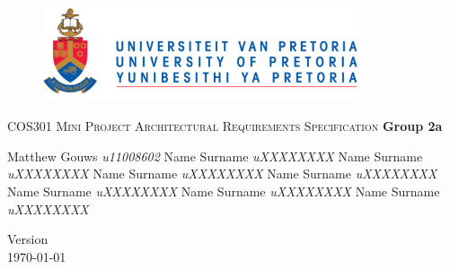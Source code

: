 \begin{titlepage}
\begin{center}
	\begin{figure}[t]
		\centering
		\includegraphics[width=350px]{UP_Logo.png}
	\end{figure}
	
\textsc{\LARGE COS301 Mini Project \newline\newline Architectural Requirements Specification}
		\textbf{\newline Group 2a} \\
		\begin{flushright} \large
			Matthew Gouws \emph{u11008602} \newline
			Name Surname \emph{uXXXXXXXX} \newline
			Name Surname \emph{uXXXXXXXX} \newline
			Name Surname \emph{uXXXXXXXX} \newline
			Name Surname \emph{uXXXXXXXX} \newline
			Name Surname \emph{uXXXXXXXX} \newline
			Name Surname \emph{uXXXXXXXX} \newline
			Name Surname \emph{uXXXXXXXX} \newline
		\end{flushright}
		
		\vfill
		
		{\large Version }
		\\
		{\large \today}
		
\end{center}
\end{titlepage}